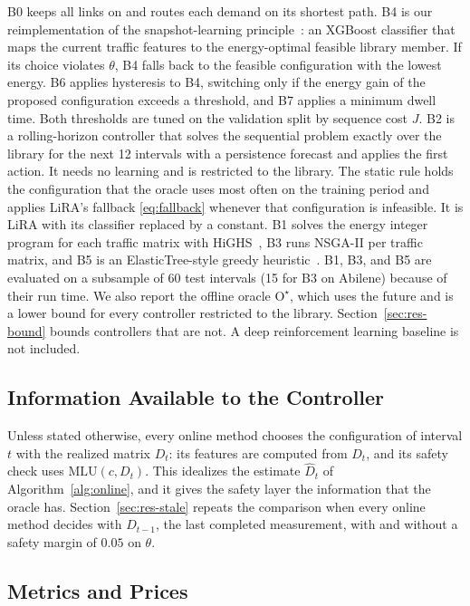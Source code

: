 \documentclass[journal]{IEEEtran}
\begin{document}
B0 keeps all links on and routes each demand on its shortest path. B4 is our reimplementation of the snapshot-learning principle~\cite{gomezdelahiz2025noms,gomezdelahiz2026tgcn}: an XGBoost classifier that maps the current traffic features to the energy-optimal feasible library member. If its choice violates $\theta$, B4 falls back to the feasible configuration with the lowest energy. B6 applies hysteresis to B4, switching only if the energy gain of the proposed configuration exceeds a threshold, and B7 applies a minimum dwell time. Both thresholds are tuned on the validation split by sequence cost $J$. B2 is a rolling-horizon controller that solves the sequential problem exactly over the library for the next 12 intervals with a persistence forecast and applies the first action. It needs no learning and is restricted to the library. The static rule holds the configuration that the oracle uses most often on the training period and applies LiRA's fallback \eqref{eq:fallback} whenever that configuration is infeasible. It is LiRA with its classifier replaced by a constant. B1 solves the energy integer program for each traffic matrix with HiGHS~\cite{huangfu2018highs}, B3 runs NSGA-II per traffic matrix, and B5 is an ElasticTree-style greedy heuristic~\cite{heller2010elastictree}. B1, B3, and B5 are evaluated on a subsample of 60 test intervals (15 for B3 on Abilene) because of their run time. We also report the offline oracle $\mathrm{O}^\star$, which uses the future and is a lower bound for every controller restricted to the library. Section~\ref{sec:res-bound} bounds controllers that are not. A deep reinforcement learning baseline is not included.

\subsection{Information Available to the Controller}\label{sec:protocol}

Unless stated otherwise, every online method chooses the configuration of interval $t$ with the realized matrix $D_t$: its features are computed from $D_t$, and its safety check uses $\mathrm{MLU}(c,D_t)$. This idealizes the estimate $\hat D_t$ of Algorithm~\ref{alg:online}, and it gives the safety layer the information that the oracle has. Section~\ref{sec:res-stale} repeats the comparison when every online method decides with $D_{t-1}$, the last completed measurement, with and without a safety margin of $0.05$ on $\theta$.

\subsection{Metrics and Prices}
\end{document}
